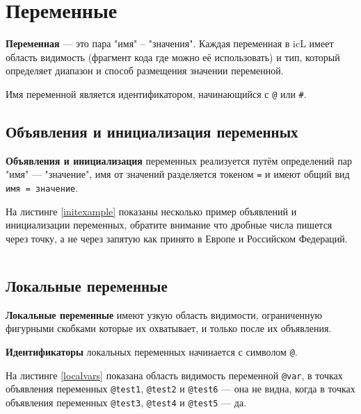 \section{Переменные}

\textbf{Переменная} — это пара "имя" – "значения". Каждая переменная в icL имеет область видимость (фрагмент кода где можно её использовать) и тип, который определяет диапазон и способ размещения значении переменной.

Имя переменной является идентификатором, начинающийся с \texttt{@} или {\color{blue2}\texttt{#}}.

\subsection{Объявления и инициализация переменных}

\textbf{Объявления и инициализация} переменных реализуется путём определений пар "имя" — "значение", имя от значений разделяется токеном \texttt{=} и имеют общий вид \texttt{имя = значение}.

На листинге \ref{initexample} показаны несколько пример объявлений и инициализации переменных, обратите внимание что дробные числа пишется через точку, а не через запятую как принято в Европе и Российском Федераций.

\begin{sourcecode}
	\label{initexample}
    \inputminted[linenos]{icl}{../sources/initexample.icL}
\end{sourcecode}

\subsection{Локальные переменные}

\textbf{Локальные переменные} имеют узкую область видимости, ограниченную фигурными скобками которые их охватывает, и только после их объявления.

{\bf Идентификаторы} локальных переменных начинается с символом \texttt{@}.

На листинге \ref{localvars} показана область видимость переменной \texttt{@var}, в точках объявления переменных \texttt{@test1}, \texttt{@test2} и \texttt{@test6} — она не видна, когда в точках объявления переменных \texttt{@test3}, \texttt{@test4} и \texttt{@test5} — да.
\begin{sourcecode}
	\label{localvars}
    \inputminted[linenos]{icl}{../sources/localvars.icL}
\end{sourcecode}


